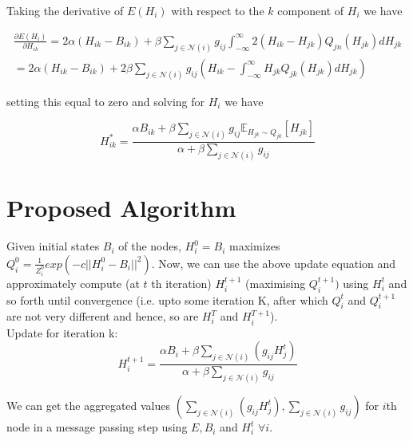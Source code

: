 Taking the derivative of $E(H_i)$ with respect to the $k$ component of $H_i$ we have

\begin{multline}
\frac{\partial E(H_i)} {\partial H_{ik}} = 2\alpha (H_{ik} - B_{ik}) + \beta \sum_{j \in \mathcal{N}(i)} g_{ij} \int_{-\infty}^{\infty} 2 (H_{ik} - H_{jk})  Q_{jn}(H_{jk}) d H_{jk} \\
= 2\alpha (H_{ik} - B_{ik}) + 2\beta \sum_{j \in \mathcal{N}(i)} g_{ij}  (H_{ik} - \int_{-\infty}^{\infty} H_{jk} Q_{jk}(H_{jk})d H_{jk})
\end{multline}

setting this equal to zero and solving for $H_i$ we have

\begin{equation}
H_{ik}^* = \frac{\alpha B_{ik} + \beta  \sum\limits_{j \in \mathcal{N}(i)} g_{ij} \mathbb{E}_{ H_{jk} \sim Q_{jk} } [H_{jk}]} {\alpha +  \beta  \sum \limits_{j \in \mathcal{N}(i)} g_{ij} }
\end{equation}
\section*{Proposed Algorithm}
Given initial states $B_i$ of the nodes, $H_i^0 = B_i$ maximizes $Q_i^0 = \frac{1}{Z_i^0}exp(-c||H_i^0 - B_i||^2)$. Now, we can use the above update equation and approximately     compute (at $t$ th iteration) $H_i^{t+1}$ (maximising $Q_i^{t+1})$ using $H_i^t$ and so forth until convergence (i.e. upto some iteration K, after which $Q_i^t$ and $Q_i^{t+1}$ are not very different and hence, so are $H_i^{T}$ and $H_i^{T+1}$).
\\
Update for iteration k:
\begin{equation}
 H_{i}^{t+1} = \frac{\alpha B_{i} + \beta  \sum\limits_{j \in \mathcal{N}(i)} (g_{ij} H_j^t)} {\alpha +  \beta  \sum \limits_{j \in \mathcal{N}(i)} g_{ij} }
\end{equation}

We can get the aggregated values $(\sum \limits_{j \in \mathcal{N}(i)} (g_{ij} H_j^t),\sum \limits_{j \in \mathcal{N}(i)} g_{ij})$ for $i$th node in a message passing step using $E, B_i$ and $H_i^t$ $\forall i$.
